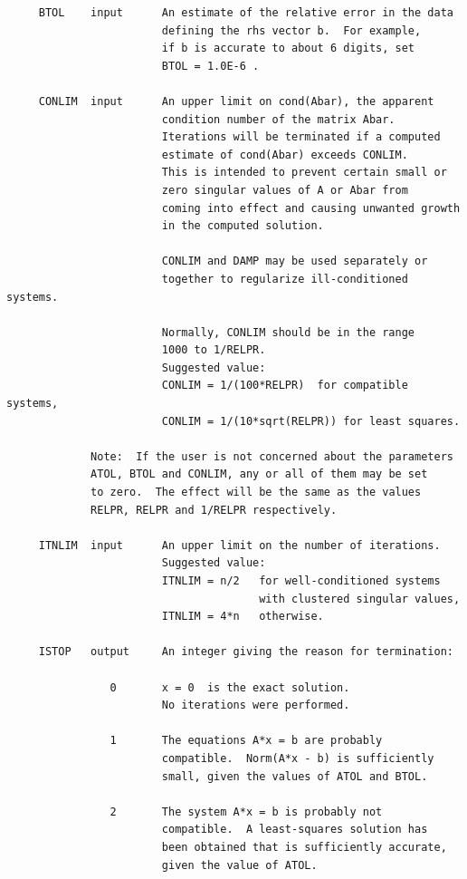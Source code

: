 \documentclass[11pt,twoside]{article}
\begin{document}
\begin{verbatim}
     BTOL    input      An estimate of the relative error in the data
                        defining the rhs vector b.  For example,
                        if b is accurate to about 6 digits, set
                        BTOL = 1.0E-6 .

     CONLIM  input      An upper limit on cond(Abar), the apparent
                        condition number of the matrix Abar.
                        Iterations will be terminated if a computed
                        estimate of cond(Abar) exceeds CONLIM.
                        This is intended to prevent certain small or
                        zero singular values of A or Abar from
                        coming into effect and causing unwanted growth
                        in the computed solution.

                        CONLIM and DAMP may be used separately or
                        together to regularize ill-conditioned systems.

                        Normally, CONLIM should be in the range
                        1000 to 1/RELPR.
                        Suggested value:
                        CONLIM = 1/(100*RELPR)  for compatible systems,
                        CONLIM = 1/(10*sqrt(RELPR)) for least squares.

             Note:  If the user is not concerned about the parameters
             ATOL, BTOL and CONLIM, any or all of them may be set
             to zero.  The effect will be the same as the values
             RELPR, RELPR and 1/RELPR respectively.

     ITNLIM  input      An upper limit on the number of iterations.
                        Suggested value:
                        ITNLIM = n/2   for well-conditioned systems
                                       with clustered singular values,
                        ITNLIM = 4*n   otherwise.

     ISTOP   output     An integer giving the reason for termination:

                0       x = 0  is the exact solution.
                        No iterations were performed.

                1       The equations A*x = b are probably
                        compatible.  Norm(A*x - b) is sufficiently
                        small, given the values of ATOL and BTOL.

                2       The system A*x = b is probably not
                        compatible.  A least-squares solution has
                        been obtained that is sufficiently accurate,
                        given the value of ATOL.


\end{verbatim}
\end{document}
